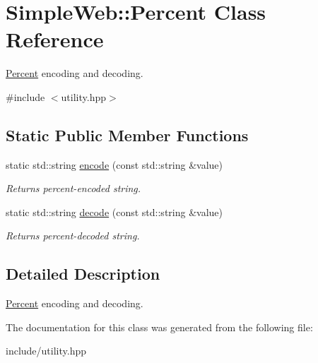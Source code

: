\hypertarget{classSimpleWeb_1_1Percent}{}\section{Simple\+Web\+:\+:Percent Class Reference}
\label{classSimpleWeb_1_1Percent}


\hyperlink{classSimpleWeb_1_1Percent}{Percent} encoding and decoding.  




{\ttfamily \#include $<$utility.\+hpp$>$}

\subsection*{Static Public Member Functions}
\begin{DoxyCompactItemize}
\item 
static std\+::string \hyperlink{classSimpleWeb_1_1Percent_a2d5384a6f304b961a8eea2b9f32942f5}{encode} (const std\+::string \&value)\hypertarget{classSimpleWeb_1_1Percent_a2d5384a6f304b961a8eea2b9f32942f5}{}\label{classSimpleWeb_1_1Percent_a2d5384a6f304b961a8eea2b9f32942f5}

\begin{DoxyCompactList}\small\item\em Returns percent-\/encoded string. \end{DoxyCompactList}\item 
static std\+::string \hyperlink{classSimpleWeb_1_1Percent_aab2b5fc2095ed71c43c22683a4598dac}{decode} (const std\+::string \&value)\hypertarget{classSimpleWeb_1_1Percent_aab2b5fc2095ed71c43c22683a4598dac}{}\label{classSimpleWeb_1_1Percent_aab2b5fc2095ed71c43c22683a4598dac}

\begin{DoxyCompactList}\small\item\em Returns percent-\/decoded string. \end{DoxyCompactList}\end{DoxyCompactItemize}


\subsection{Detailed Description}
\hyperlink{classSimpleWeb_1_1Percent}{Percent} encoding and decoding. 

The documentation for this class was generated from the following file\+:\begin{DoxyCompactItemize}
\item 
include/utility.\+hpp\end{DoxyCompactItemize}
